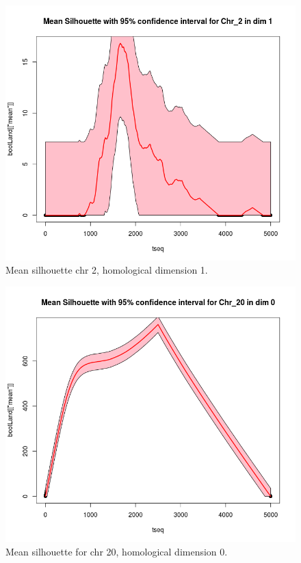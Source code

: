 \documentclass[12pt,a4paper]{article}
\begin{document}
\begin{figure}[hbtp]
\centering
\includegraphics[scale=0.75]{meanSil_chr2_dim1.png}
\caption{Mean silhouette chr 2, homological dimension 1.}
\label{fig:meanSil_chr2_dim1}
\end{figure}

\begin{figure}[hbtp]
\centering
\includegraphics[scale=0.75]{meanSil_chr20_dim0.png}
\caption{Mean silhouette for chr 20, homological dimension 0.}
\label{fig:meanSil_chr20_dim0}
\end{figure}
\end{document}
